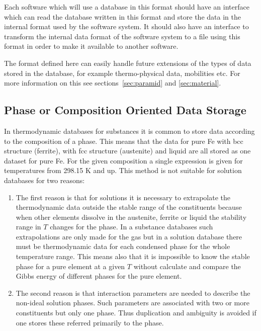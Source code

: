 \documentclass[12pt]{article}
\begin{document}
Each software which will use a database in this format should have an
interface which can read the database written in this format and store
the data in the internal format used by the software system.  It
should also have an interface to transform the internal data format of
the software system to a file using this format in order to make it
available to another software.

The format defined here can easily handle future extensions of the
types of data stored in the database, for example thermo-physical data,
mobilities etc. For more information on this see
sections~\ref{sec:paramid} and \ref{sec:material}.

\subsection{Phase or Composition Oriented Data Storage}

In thermodynamic databases for substances it is common to store data
according to the composition of a phase.  This means that the data for
pure Fe with bcc structure (ferrite), with fcc structure (austenite)
and liquid are all stored as one dataset for pure Fe.  For the given
composition a single expression is given for temperatures from 298.15
K and up.  This method is not suitable for solution databases for two
reasons:
\begin{enumerate}
\item The first reason is that for solutions it is necessary to
  extrapolate the thermodynamic data outside the stable range of the
  constituents because when other elements dissolve in the austenite,
  ferrite or liquid the stability range in $T$ changes for the phase.
  In a substance databases such extrapolations are only made for the
  gas but in a solution database there must be thermodynamic data for
  each condensed phase for the whole temperature range.  This means
  also that it is impossible to know the stable phase for a pure
  element at a given $T$ without calculate and compare the Gibbs
  energy of different phases for the pure element.

\item The second reason is that interaction parameters are needed to
  describe the non-ideal solution phases.  Such parameters
  are associated with two or more constituents but only one phase.
  Thus duplication and ambiguity is avoided if one stores these
  referred primarily to the phase.
\end{enumerate}
\end{document}
